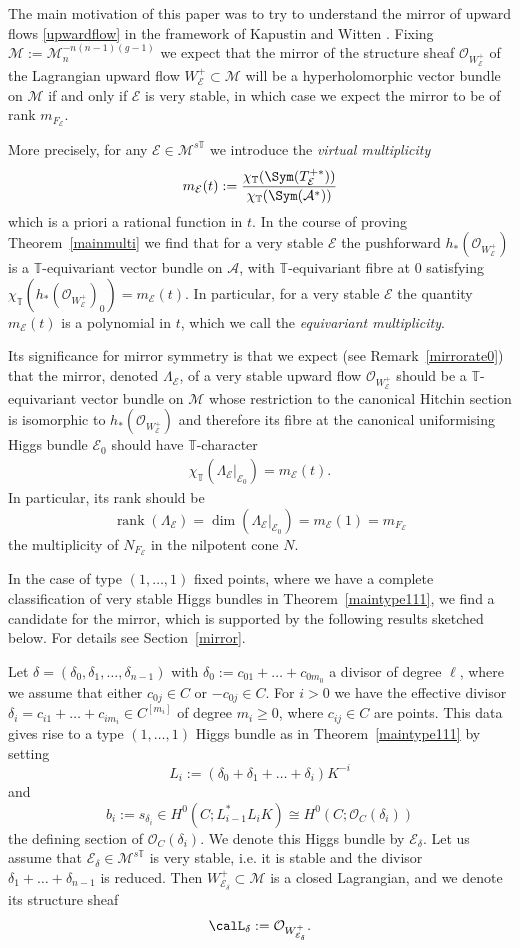 \documentclass[12pt]{article}
\numberwithin{equation}{section}
\theoremstyle{remark}
\theoremstyle{definition}
\numberwithin{theorem}{section}
\def\beq{\begin{eqnarray}}
\def\eeq{\end{eqnarray}}
\def\calE{{\mathcal E}}
\DeclareMathOperator{\rank}{rank}
\def\M{{\mathcal{M}}}
\def\calA{{\mathcal{A}}}
\newcommand{\T}{{\mathbb{T}}}
\def\calO{{\mathcal O}}
\renewcommand{\1}{\mathbbm{1}}
\begin{document}
The main motivation of this paper was to try to understand the mirror of upward flows  \eqref{upwardflow} in the framework of Kapustin and Witten \cite{kapustin-witten}. Fixing $\M:=\M_{n}^{-n(n-1)(g-1)}$ we expect that the mirror of the structure sheaf $\calO_{W^+_\calE}$ of the  Lagrangian upward flow ${W^+_\calE}\subset \M$ will be a hyperholomorphic vector bundle %
on $\M$ if and only if $\calE$ is very stable, in which case we expect the mirror to be of rank   $m_{F_\calE}$.  

More precisely,  for any $\calE\in \M^{s\T}$ we introduce the {\em virtual multiplicity} 
\beq\label{virmul}m_\calE(t):={ \chi_\T(\Sym(T^{+*}_\calE))\over \chi_\T(\Sym(\calA^*))}\eeq which is a priori  a rational function in $t$. In the course of proving Theorem~\ref{mainmulti} we find that for a very stable $\calE$ the pushforward $h_*(\calO_{W^+_\calE})$ is a $\T$-equivariant vector bundle on $\calA$, with  $\T$-equivariant fibre at $0$ satisfying $\chi_\T(h_*(\calO_{W^+_\calE})_0)=m_\calE(t)$. In particular, for a very stable $\calE$ the quantity $m_\calE(t)$ is a polynomial in $t$, which we call the {\em  equivariant multiplicity}. 

Its significance for mirror symmetry is that we expect (see Remark~\ref{mirrorate0}) that  the mirror, denoted $\Lambda_\calE$, of a very stable upward flow $\calO_{W^+_\calE}$ should be a $\T$-equivariant vector bundle on $\M$ whose restriction to the canonical Hitchin section is isomorphic to $h_*(\calO_{W^+_\calE})$ and therefore its fibre at the canonical uniformising Higgs bundle $\calE_0$ should have $\T$-character \beq \label{mirrorexp}\chi_\T(\Lambda_\calE|_{\calE_0})=m_\calE(t).\eeq In particular, its rank should be $$\rank(\Lambda_\calE)=\dim(\Lambda_\calE|_{\calE_0})=m_\calE(1)=m_{F_\calE}$$ the multiplicity of $N_{F_\calE}$ in the nilpotent cone $N$. 

In the case of type $(1,\dots,1)$ fixed points, where we have a complete classification of very stable Higgs bundles in Theorem~\ref{maintype111}, we  find a candidate for the mirror, which is supported by the following results sketched below. For details see Section~\ref{mirror}. 

Let $\delta=(\delta_0,\delta_1,\dots,\delta_{n-1})$ with $\delta_0:=c_{01}+\dots+c_{0m_0}$ a divisor of degree $\ell$, where we assume that either $c_{0j}\in C$ or $-c_{0j}\in C$.  For $i>0$ we have the effective divisor $\delta_i={c_{i1}+\dots+c_{im_{i}}}\in C^{[m_i]}$  of degree $m_i\geq 0$, where $c_{ij}\in C$ are points. This data gives rise to a type $(1,\dots,1)$ Higgs bundle  as in Theorem~\ref{maintype111} by setting $$L_i:=(\delta_0+\delta_1+\dots + \delta_{i})K^{-i}$$ and $$b_i:=s_{\delta_i}\in H^0(C;L_{i-1}^*L_{i}K)\cong H^0(C;\calO_C(\delta_i))$$ the defining section of $\calO_C(\delta_i)$. We  denote this Higgs bundle by  $\calE_\delta$. Let us assume that  $\calE_\delta\in \M^{s\T}$ is very stable, i.e. it is stable and the divisor $\delta_1+\dots + \delta_{n-1}$ is reduced. Then $W^+_{\calE_\delta}\subset \M$ is a closed Lagrangian, and we denote its structure sheaf $$\calL_\delta:=\calO_{W^+_{\calE_\delta}}.$$
\end{document}
